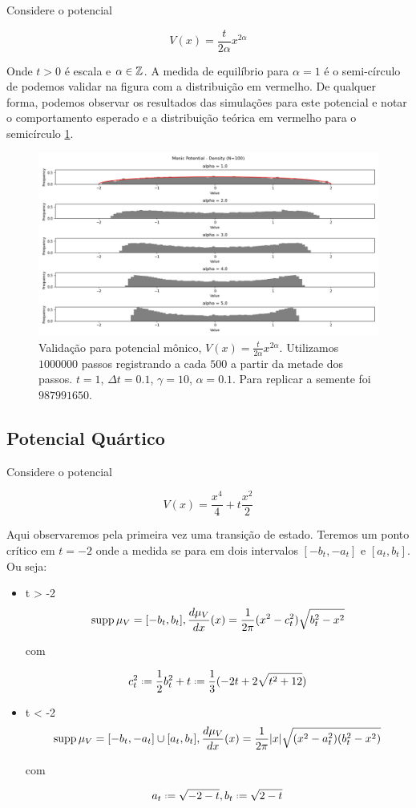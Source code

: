 Considere o potencial

\[
	V(x) = \frac{t}{2\alpha} x^{2\alpha}
\]

Onde $t > 0$ é escala e $\alpha \in \mathbb{Z}$. A medida de equilíbrio para $\alpha = 1$ é o semi-círculo de podemos validar na figura com a distribuição em vermelho. De qualquer forma, podemos observar os resultados das simulações para este potencial e notar o comportamento esperado e a distribuição teórica em vermelho para o semicírculo \ref{fig: monic}.


\begin{figure}[ht]
	\centering
	\includegraphics[scale=0.4]{Assets/validationArticleMonic}
	\caption{Validação para potencial mônico, $V(x) = \frac{t}{2 \alpha} x^{2\alpha}$. Utilizamos $1000000$ passos registrando a cada $500$ a partir da metade dos passos. $t = 1$, $\Delta t = 0.1$, $\gamma = 10$, $\alpha = 0.1$. Para replicar a semente foi $987991650$.}
	\label{fig: monic}
\end{figure}


\subsection{Potencial Quártico}

Considere o potencial

\[
	V(x) = \frac{x^4}{4} + t \frac{x^2}{2}
\]

Aqui observaremos pela primeira vez uma transição de estado. Teremos um ponto crítico em $t=-2$ onde a medida se para em dois intervalos $[-b_t, -a_t]$ e $[a_t, b_t]$. Ou seja:

\begin{itemize}
	\item t > -2
	\[
	\operatorname{supp} \mu_V = [-b_t, b_t], \frac{d \mu_V}{dx}(x) = \frac{1}{2\pi} (x^2 - c_t^2) \sqrt{b_t^2 - x^2} 
	\]
	
	com
	
	\[
		c_t^2 \deff\frac{1}{2} b_t^2 + t \deff \frac{1}{3} (-2t + 2 \sqrt{t^2 + 12})
	\]
	
	\item t < -2
	\[
	\operatorname{supp} \mu_V = [-b_t, -a_t] \cup [a_t, b_t], \frac{d \mu_V}{dx}(x) = \frac{1}{2\pi} |x| \sqrt{(x^2 - a_t^2)(b_t^2 - x^2)} 
	\]
	
	com
	
	\[
	a_t \deff \sqrt{-2-t}, b_t \deff \sqrt{2-t}
	\]
\end{itemize}


